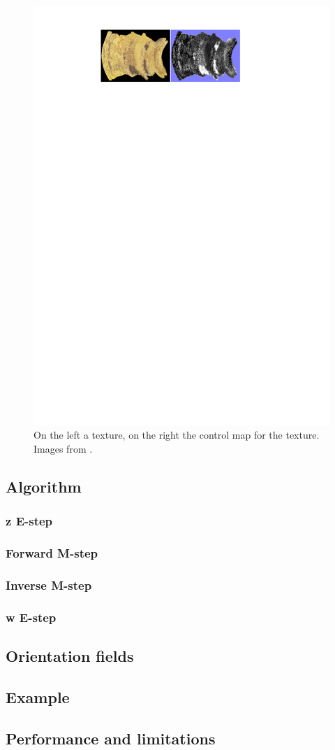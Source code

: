 \begin{figure}[h]
\centering
\includegraphics[scale=0.9]{img/controlmaps}
\caption[Control maps]{On the left a texture, on the right the control map for the texture.\\ Images from \cite{its}.}
\label{fig:Control maps}
\end{figure}


\subsection{Algorithm}
\subsubsection{z E-step}
\subsubsection{Forward M-step}
\subsubsection{Inverse M-step}
\subsubsection{w E-step}
\subsection{Orientation fields}
\subsection{Example}
\subsection{Performance and limitations}